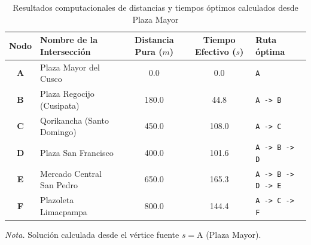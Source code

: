 \begin{table}[H]
    \centering
    \fontsize{10}{12.5}\selectfont
    \caption{Resultados computacionales de distancias y tiempos óptimos calculados desde Plaza Mayor}
    \label{tab:resultados_distancias}
    \begin{tabularx}{\textwidth}{clccX}
        \toprule
        \textbf{Nodo} & \textbf{Nombre de la Intersección} & \textbf{Distancia Pura ($m$)} & \textbf{Tiempo Efectivo ($s$)} & \textbf{Ruta óptima} \\
        \midrule
        \textbf{A} & Plaza Mayor del Cusco & 0.0 & 0.0 & \texttt{A} \\
        \textbf{B} & Plaza Regocijo (Cusipata) & 180.0 & 44.8 & \texttt{A -> B} \\
        \textbf{C} & Qorikancha (Santo Domingo) & 450.0 & 108.0 & \texttt{A -> C} \\
        \textbf{D} & Plaza San Francisco & 400.0 & 101.6 & \texttt{A -> B -> D} \\
        \textbf{E} & Mercado Central San Pedro & 650.0 & 165.3 & \texttt{A -> B -> D -> E} \\
        \textbf{F} & Plazoleta Limacpampa & 800.0 & 144.4 & \texttt{A -> C -> F} \\
        \bottomrule
    \end{tabularx}
    \par\vspace{0.15cm}
    \raggedright
    \textit{Nota.} Solución calculada desde el vértice fuente $s = \text{A}$ (Plaza Mayor).
\end{table}
